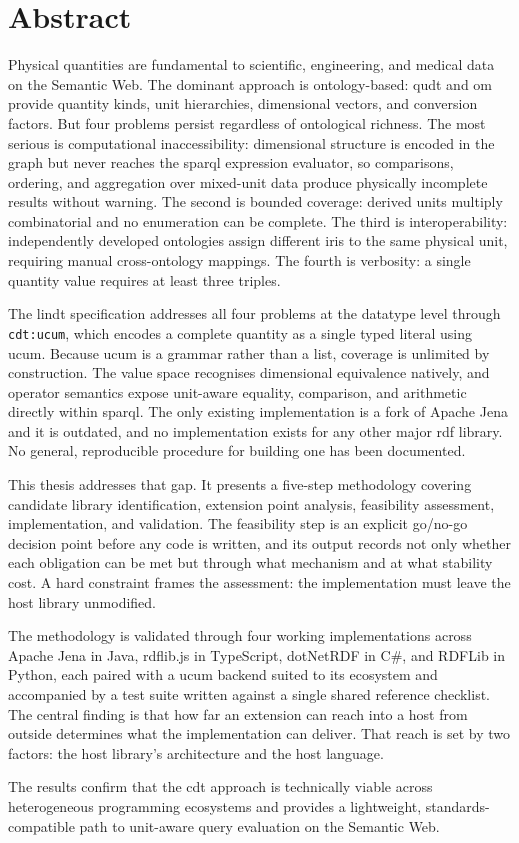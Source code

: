 \chapter*{Abstract}

Physical quantities are fundamental to scientific, engineering, and medical data on the Semantic Web. The dominant approach is ontology-based: \ac{qudt} and \ac{om} provide quantity kinds, unit hierarchies, dimensional vectors, and conversion factors. But four problems persist regardless of ontological richness. The most serious is computational inaccessibility: dimensional structure is encoded in the graph but never reaches the \ac{sparql} expression evaluator, so comparisons, ordering, and aggregation over mixed-unit data produce physically incomplete results without warning. The second is bounded coverage: derived units multiply combinatorial and no enumeration can be complete. The third is interoperability: independently developed ontologies assign different \acp{iri} to the same physical unit, requiring manual cross-ontology mappings. The fourth is verbosity: a single quantity value requires at least three triples.

The \ac{lindt} specification addresses all four problems at the datatype level through \texttt{cdt:ucum}, which encodes a complete quantity as a single typed literal using \ac{ucum}. Because \ac{ucum} is a grammar rather than a list, coverage is unlimited by construction. The value space recognises dimensional equivalence natively, and operator semantics expose unit-aware equality, comparison, and arithmetic directly within \ac{sparql}. The only existing implementation is a fork of Apache Jena and it is outdated, and no implementation exists for any other major \ac{rdf} library. No general, reproducible procedure for building one has been documented.

This thesis addresses that gap. It presents a five-step methodology covering candidate library identification, extension point analysis, feasibility assessment, implementation, and validation. The feasibility step is an explicit go/no-go decision point before any code is written, and its output records not only whether each obligation can be met but through what mechanism and at what stability cost. A hard constraint frames the assessment: the implementation must leave the host library unmodified.

The methodology is validated through four working implementations across Apache Jena in Java, rdflib.js in TypeScript, dotNetRDF in C\#, and RDFLib in Python, each paired with a \ac{ucum} backend suited to its ecosystem and accompanied by a test suite written against a single shared reference checklist. The central finding is that how far an extension can reach into a host from outside determines what the implementation can deliver. That reach is set by two factors: the host library's architecture and the host language. 

The results confirm that the \ac{cdt} approach is technically viable across heterogeneous programming ecosystems and provides a lightweight, standards-compatible path to unit-aware query evaluation on the Semantic Web.